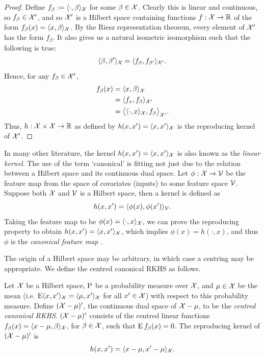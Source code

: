 \begin{proof}
  Define $f_\beta := \langle\cdot,\beta\rangle_{\mathcal X}$ for some $\beta \in {\mathcal X}$.
  Clearly this is linear and continuous, so $f_\beta\in{\mathcal X}'$, and so ${\mathcal X}'$ is a Hilbert space containing functions $f:{\mathcal X}\to\mathbb{R}$ of the form $f_\beta(x) = \langle x,\beta\rangle_{\mathcal X}$.
  By the Riesz representation theorem, every element of ${\mathcal X}'$ has the form $f_\beta$.
  It also gives us a natural isometric isomorphism such that the following is true:
  \[
    \langle\beta,\beta'\rangle_{\mathcal X} = \langle f_\beta,f_{\beta'}\rangle_{{\mathcal X}'}.
  \]
  Hence, for any $f_\beta\in{\mathcal X}'$, 
  \begin{align*}
    f_\beta(x) 
    &= \langle x,\beta\rangle_{\mathcal X} \\
    &= \langle f_x,f_{\beta}\rangle_{{\mathcal X}'} \\
    &= \big\langle \langle\cdot,x\rangle_{\mathcal X},f_{\beta} \big\rangle_{{\mathcal X}'}.
  \end{align*}
  Thus, $h:{\mathcal X}\times{\mathcal X}\to\mathbb{R}$ as defined by $h(x,x') = \langle x,x'\rangle_{\mathcal X}$ is the reproducing kernel of ${\mathcal X}'$.
\end{proof}

In many other literature, the kernel $h(x,x') = \langle x,x'\rangle_{\mathcal X}$ is also known as the \emph{linear kernel}.
The use of the term `canonical' is fitting not just due to the relation between a Hilbert space and its continuous dual space.
Let $\phi:{\mathcal X}\to{\mathcal V}$ be the feature map from the space of covariates (inputs) to some feature space ${\mathcal V}$.
Suppose both ${\mathcal X}$ and ${\mathcal V}$ is a Hilbert space, then a kernel is defined as 
\[
  h(x,x') = \langle\phi(x),\phi(x')\rangle_{\mathcal V}.
\]
Taking the feature map to be $\phi(x) = \langle\cdot,x\rangle_{\mathcal X}$, we can prove the reproducing property to obtain $h(x,x') = \langle x,x'\rangle_{\mathcal X}$, which implies $\phi(x) = h(\cdot,x)$, and thus $\phi$ is the \emph{canonical feature map} \citep[Lemma 4.19]{steinwart2008support}.

The origin of a Hilbert space may be arbitrary, in which case a centring may be appropriate.
We define the centred canonical RKHS as follows.

\begin{definition}
  Let ${\mathcal X}$ be a Hilbert space, $\operatorname{P}$ be a probability measure over ${\mathcal X}$, and $\mu\in{\mathcal X}$ be the mean (i.e. $\operatorname{E}\langle x,x'\rangle_{{\mathcal X}}  = \langle\mu,x'\rangle_{{\mathcal X}}$ for all $x' \in {\mathcal X}$) with respect to this probability measure.
  Define $({\mathcal X} - \mu)'$, the continuous dual space of ${\mathcal X} - \mu$, to be the \emph{centred canonical RKHS}.
  $({\mathcal X} - \mu)'$ consists of the centred linear functions $f_\beta(x)=\langle x-\mu,\beta\rangle_{\mathcal X}$, for $\beta\in{\mathcal X}$, such that $\operatorname{E} f_\beta(x) = 0$.
  The reproducing kernel of $({\mathcal X} - \mu)'$ is
  \[
    h(x,x') = \langle x-\mu,x'-\mu\rangle_{\mathcal X}.
  \]
\end{definition}

